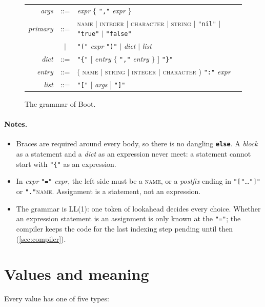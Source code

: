 \documentclass[11pt,a4paper]{article}
\newcommand{\lang}{Boot}
\newcommand{\kw}[1]{\textbf{\texttt{#1}}}
\newcommand{\nt}[1]{\textit{#1}}
\newcommand{\tok}[1]{\texttt{"#1"}}
\begin{document}
\begin{figure}[t]
\begin{tabular}{@{}r@{\quad}c@{\quad}l@{}}
\nt{args}     & ::= & \nt{expr} $\{$ \tok{,} \nt{expr} $\}$\\
\nt{primary}  & ::= & \textsc{name} $\mid$ \textsc{integer} $\mid$ \textsc{character} $\mid$ \textsc{string}
                $\mid$ \tok{nil} $\mid$ \tok{true} $\mid$ \tok{false}\\
              & $\mid$ & \tok{(} \nt{expr} \tok{)} $\mid$ \nt{dict} $\mid$ \nt{list}\\
\nt{dict}     & ::= & \tok{\{} [ \nt{entry} $\{$ \tok{,} \nt{entry} $\}$ ] \tok{\}}\\
\nt{entry}    & ::= & ( \textsc{name} $\mid$ \textsc{string} $\mid$ \textsc{integer} $\mid$ \textsc{character} ) \tok{:} \nt{expr}\\
\nt{list}     & ::= & \tok{[} [ \nt{args} ] \tok{]}\\
\end{tabular}
\caption{The grammar of \lang.}
\label{fig:grammar}
\end{figure}

\paragraph{Notes.}
\begin{itemize}[nosep]
\item Braces are required around every body, so there is no dangling
  \kw{else}. A \nt{block} as a statement and a \nt{dict} as an expression
  never meet: a statement cannot start with \tok{\{} as an expression.
\item In \nt{expr} \tok{=} \nt{expr}, the left side must be a
  \textsc{name}, or a \nt{postfix} ending in \tok{[}\ldots\tok{]} or
  \tok{.}\textsc{name}. Assignment is a statement, not an expression.
\item The grammar is LL(1): one token of lookahead decides every choice.
  Whether an expression statement is an assignment is only known at the
  \tok{=}; the compiler keeps the code for the last indexing step pending
  until then (\cref{sec:compiler}).
\end{itemize}

\section{Values and meaning}\label{sec:values}

Every value has one of five types:
\end{document}
